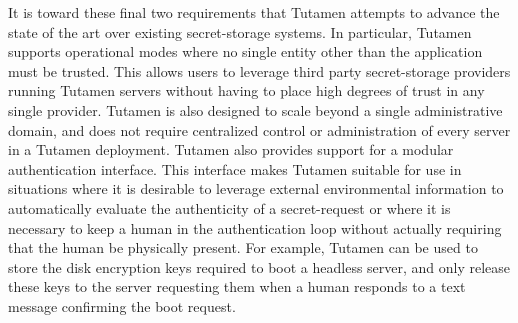 It is toward these final two requirements that Tutamen attempts to
advance the state of the art over existing secret-storage systems. In
particular, Tutamen supports operational modes where no single entity
other than the application must be trusted. This allows users to
leverage third party secret-storage providers running Tutamen servers
without having to place high degrees of trust in any single
provider. Tutamen is also designed to scale beyond a single
administrative domain, and does not require centralized control or
administration of every server in a Tutamen deployment. Tutamen also
provides support for a modular authentication interface. This
interface makes Tutamen suitable for use in situations where it is
desirable to leverage external environmental information to
automatically evaluate the authenticity of a secret-request or where
it is necessary to keep a human in the authentication loop without
actually requiring that the human be physically present. For example,
Tutamen can be used to store the disk encryption keys required to boot
a headless server, and only release these keys to the server
requesting them when a human responds to a text message confirming the
boot request.

